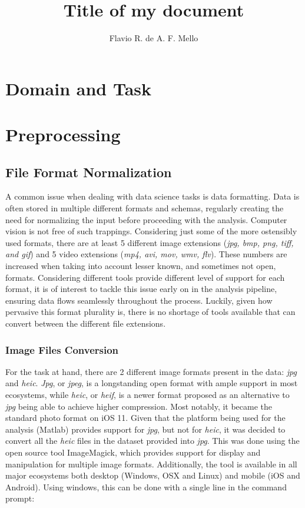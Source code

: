 \documentclass[11pt]{article}
\title{Title of my document}
\author{Flavio R. de A. F. Mello}
\begin{document}
\maketitle

\section{Domain and Task}

\section{Preprocessing}

    \subsection{File Format Normalization}
        A common issue when dealing with data science tasks is data formatting. Data is often stored in multiple different formats and schemas, regularly creating the need for normalizing the input before proceeding with the analysis. Computer vision is not free of such trappings. Considering just some of the more ostensibly used formats, there are at least 5 different image extensions (\textit{jpg, bmp, png, tiff, and gif}) and 5 video extensions (\textit{mp4, avi, mov, wmv, flv}). These numbers are increased when taking into account lesser known, and sometimes not open, formats. Considering different tools provide different level of support for each format, it is of interest to tackle this issue early on in the analysis pipeline, ensuring data flows seamlessly throughout the process. Luckily, given how pervasive this format plurality is, there is no shortage of tools available that can convert between the different file extensions.

    \subsubsection{Image Files Conversion}
        For the task at hand, there are 2 different image formats present in the data: \textit{jpg} and \textit{heic}. \textit{Jpg}, or \textit{jpeg}, is a longstanding open format with ample support in most ecosystems, while \textit{heic}, or \textit{heif}, is a newer format proposed as an alternative to \textit{jpg} being able to achieve higher compression. Most notably, it became the standard photo format on iOS 11. Given that the platform being used for the analysis (Matlab) provides support for \textit{jpg}, but not for \textit{heic}, it was decided to convert all the \textit{heic} files in the dataset provided into \textit{jpg}. This was done using the open source tool ImageMagick, which provides support for display and manipulation for multiple image formats. Additionally, the tool is available in all major ecosystems both desktop (Windows, OSX and Linux) and mobile (iOS and Android). Using windows, this can be done with a single line in the command prompt:
\end{document}
